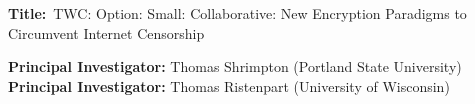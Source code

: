 \documentclass[10pt,times]{article}
\begin{document}


\noindent\textbf{Title:}\ \textsf{TWC: Option: Small: Collaborative:   
New Encryption Paradigms to Circumvent Internet Censorship}

\medskip

\noindent\textbf{Principal Investigator:} Thomas Shrimpton (Portland
State University)\\
\noindent\textbf{Principal Investigator:} Thomas Ristenpart
(University of Wisconsin)\\
\medskip

\noindent\hrulefill
{}









\end{document}
